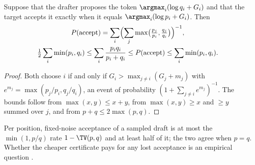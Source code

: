 \begin{proposition}\label{prop:coupling}
Suppose that the drafter proposes the token $\argmax_i(\log q_i+G_i)$ and that the target accepts it exactly when it equals $\argmax_i(\log p_i+G_i)$. Then
\begin{gather*}
P(\text{accept})=\sum_i\Bigl(\sum_j\max\bigl(\tfrac{p_j}{p_i},\tfrac{q_j}{q_i}\bigr)\Bigr)^{-1},\\
\tfrac12\sum_i\min(p_i,q_i)\le\sum_i\frac{p_iq_i}{p_i+q_i}\le P(\text{accept})\le\sum_i\min(p_i,q_i).
\end{gather*}
\end{proposition}
\begin{proof}
Both choose $i$ if and only if $G_i>\max_{j\ne i}(G_j+m_j)$ with $e^{m_j}=\max(p_j/p_i,q_j/q_i)$, an event of probability $(1+\sum_{j\ne i}e^{m_j})^{-1}$. The bounds follow from $\max(x,y)\le x+y$, from $\max(x,y)\ge x$ and $\ge y$ summed over $j$, and from $p+q\le2\max(p,q)$.
\end{proof}
Per position, fixed-noise acceptance of a sampled draft is at most the $\min(1,p/q)$ rate $1-\TV(p,q)$ and at least half of it; the two agree when $p=q$. Whether the cheaper certificate pays for any lost acceptance is an empirical question .

